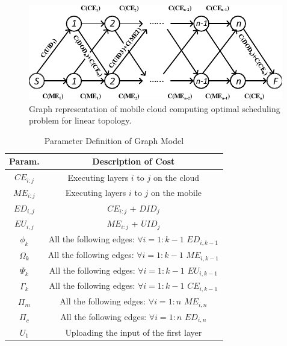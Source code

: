 \begin{figure}[t]
\includegraphics{linear_topology_mc}
\caption{Graph representation of mobile cloud computing optimal scheduling problem for linear topology.}
\label{linear_topology_mc}
\end{figure}


\begin{table}[b]
\caption{Parameter Definition of Graph Model} %
\label{nonlin_inputs} %
\centering %
\begin{tabular}{|c|c|} %
\hline %
\textbf{Param.} & \textbf{Description of Cost}\\ [0.5ex] %
\hline %
$CE_{i:j}$ & Executing layers $i$ to $j$ on the cloud \\
\hline %
$ME_{i:j}$ & Executing layers $i$ to $j$ on the mobile \\
\hline %
$ED_{i,j}$ & $CE_{i:j}$ + $DID_j$\\
\hline %
$EU_{i,j}$ & $ME_{i:j}$ + $UID_j$\\
\hline %
$\phi_{k}$ & All the following edges: $\forall i=1:k-1$ $ED_{i,k-1}$\\
\hline %
$\Omega_{k}$ & All the following edges: $\forall i=1:k-1$ $ME_{i,k-1}$\\
\hline %
$\Psi_{k}$ & All the following edges: $\forall i=1:k-1$ $EU_{i,k-1}$\\
\hline %
$\Gamma_{k}$ &  All the following edges: $\forall i=1:k-1$ $CE_{i,k-1}$\\
\hline %
$\Pi_m$ & All the following edges: $\forall i=1:n$ $ME_{i,n}$\\
\hline %
$\Pi_c$ & All the following edges: $\forall i=1:n$ $ED_{i,n}$\\
\hline %
$U_1$ & Uploading the input of the first layer\\
\hline %
\end{tabular}
\label{jointDNNGraphParam}
\end{table}

